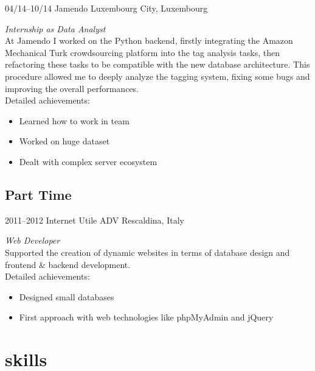 \documentclass[]{friggeri-cv} %
\begin{document}
\begin{entrylist}
\entry
{04/14--10/14}
{Jamendo}
{Luxembourg City, Luxembourg}
{\emph{Internship as Data Analyst} \\
At Jamendo I worked on the Python backend, firstly integrating the Amazon Mechanical Turk crowdsourcing platform into the tag analysis tasks, then refactoring these tasks to be compatible with the new database architecture. This procedure allowed me to deeply analyze the tagging system, fixing some bugs and improving the overall performances. \\
Detailed achievements:
\begin{itemize}
  \item Learned how to work in team
  \item Worked on huge dataset
  \item Dealt with complex server ecosystem
\end{itemize}}


\end{entrylist}

\subsection{Part Time}

\begin{entrylist}

\entry
{2011--2012}
{Internet Utile ADV}
{Rescaldina, Italy}
{\emph{Web Developer} \\
Supported the creation of dynamic websites in terms of database design and frontend \& backend development. \\
Detailed achievements:
\begin{itemize}
  \item Designed small databases
  \item First approach with web technologies like phpMyAdmin and jQuery
\end{itemize}}


\end{entrylist}


\section{skills}
\end{document}
